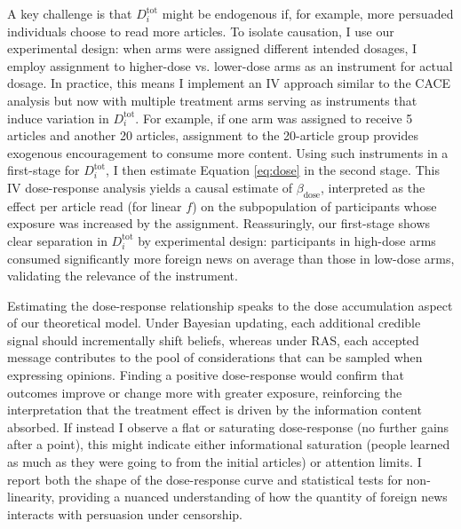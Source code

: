 \documentclass[12pt, american]{article}
\begin{document}
A key challenge is that $D_{i}^{\text{tot}}$ might be endogenous if, for example, more persuaded individuals choose to read more articles. To isolate causation, I use our experimental design: when arms were assigned different intended dosages, I employ assignment to higher-dose vs. lower-dose arms as an instrument for actual dosage. In practice, this means I implement an IV approach similar to the CACE analysis but now with multiple treatment arms serving as instruments that induce variation in $D_{i}^{\text{tot}}$. For example, if one arm was assigned to receive 5 articles and another 20 articles, assignment to the 20-article group provides exogenous encouragement to consume more content. Using such instruments in a first-stage for $D_{i}^{\text{tot}}$, I then estimate Equation \eqref{eq:dose} in the second stage. This IV dose-response analysis yields a causal estimate of $\beta_{\text{dose}}$, interpreted as the effect per article read (for linear $f$) on the subpopulation of participants whose exposure was increased by the assignment. Reassuringly, our first-stage shows clear separation in $D_{i}^{\text{tot}}$ by experimental design: participants in high-dose arms consumed significantly more foreign news on average than those in low-dose arms, validating the relevance of the instrument.

Estimating the dose-response relationship speaks to the dose accumulation aspect of our theoretical model. Under Bayesian updating, each additional credible signal should incrementally shift beliefs, whereas under RAS, each accepted message contributes to the pool of considerations that can be sampled when expressing opinions. Finding a positive dose-response would confirm that outcomes improve or change more with greater exposure, reinforcing the interpretation that the treatment effect is driven by the information content absorbed. If instead I observe a flat or saturating dose-response (no further gains after a point), this might indicate either informational saturation (people learned as much as they were going to from the initial articles) or attention limits. I report both the shape of the dose-response curve and statistical tests for non-linearity, providing a nuanced understanding of how the quantity of foreign news interacts with persuasion under censorship.
\end{document}

